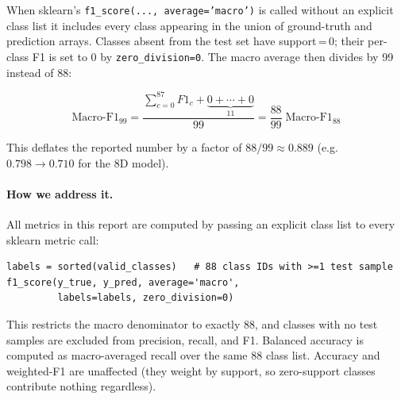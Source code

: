 When sklearn's \texttt{f1\_score(..., average='macro')} is called without
an explicit class list it includes every class appearing in the union of
ground-truth and prediction arrays.
Classes absent from the test set have support\,=\,0; their per-class F1 is
set to 0 by \texttt{zero\_division=0}.
The macro average then divides by 99 instead of 88:

\[
  \text{Macro-F1}_{99} = \frac{\sum_{c=0}^{87} F1_c +
    \underbrace{0 + \cdots + 0}_{11}}{99}
  = \frac{88}{99}\;\text{Macro-F1}_{88}
\]

This deflates the reported number by a factor of $88/99 \approx 0.889$
(e.g.\ $0.798 \rightarrow 0.710$ for the 8D model).

\paragraph{How we address it.}
All metrics in this report are computed by passing an explicit class list
to every sklearn metric call:

\begin{verbatim}
labels = sorted(valid_classes)   # 88 class IDs with >=1 test sample
f1_score(y_true, y_pred, average='macro',
         labels=labels, zero_division=0)
\end{verbatim}

This restricts the macro denominator to exactly 88, and classes with no
test samples are excluded from precision, recall, and F1.
Balanced accuracy is computed as macro-averaged recall over the same 88
class list.
Accuracy and weighted-F1 are unaffected (they weight by support, so
zero-support classes contribute nothing regardless).
